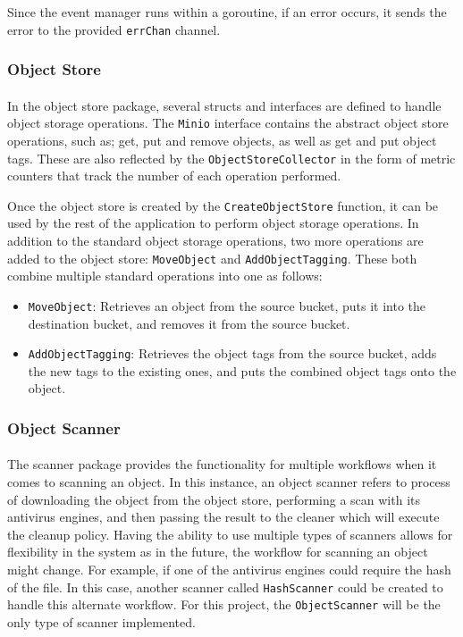 \documentclass[12pt, conference, final, a4paper, onecolumn, compsoc]{IEEEtran}
\begin{document}
Since the event manager runs within a goroutine, if an error occurs, it sends
the error to the provided \texttt{errChan} channel.

\subsubsection*{Object Store}
\paragraph{}
In the object store package, several structs and interfaces are defined to
handle object storage operations. The \texttt{Minio} interface contains the
abstract object store operations, such as; get, put and remove objects, as well
as get and put object tags. These are also reflected by the
\texttt{ObjectStoreCollector} in the form of metric counters that track the
number of each operation performed.

Once the object store is created by the \texttt{CreateObjectStore} function, it
can be used by the rest of the application to perform object storage operations.
In addition to the standard object storage operations, two more operations are
added to the object store: \texttt{MoveObject} and \texttt{AddObjectTagging}.
These both combine multiple standard operations into one as follows:

\begin{itemize}
  \item \texttt{MoveObject}: Retrieves an object from the source bucket, puts it
        into the destination bucket, and removes it from the source bucket.
  \item \texttt{AddObjectTagging}: Retrieves the object tags from the source
        bucket, adds the new tags to the existing ones, and puts the combined
        object tags onto the object.
\end{itemize}

\subsubsection*{Object Scanner}
\paragraph{}
The scanner package provides the functionality for multiple workflows when it
comes to scanning an object. In this instance, an object scanner refers to
process of downloading the object from the object store, performing a scan with
its antivirus engines, and then passing the result to the cleaner which will
execute the cleanup policy. Having the ability to use multiple types of scanners
allows for flexibility in the system as in the future, the workflow for scanning
an object might change. For example, if one of the antivirus engines could
require the hash of the file. In this case, another scanner called
\texttt{HashScanner} could be created to handle this alternate workflow. For
this project, the \texttt{ObjectScanner} will be the only type of scanner
implemented.
\end{document}
